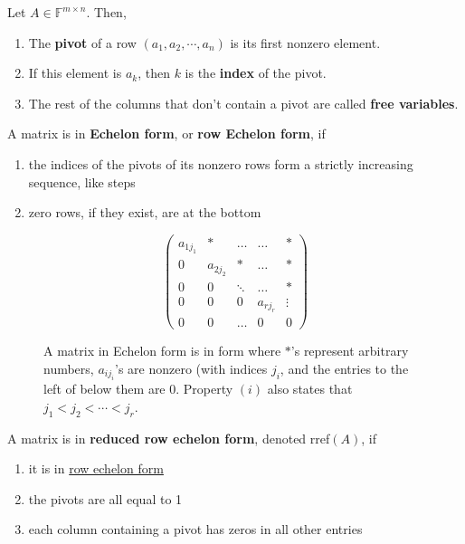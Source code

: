  \begin{definition}[Pivot]
    \label{def:pivot}
		Let $A \in \mathbb{F}^{m \times n}$. Then, 
		\begin{enumerate}
		  \item The \textbf{pivot} of a row $(a_1, a_2, \cdots, a_n)$ is its first nonzero element. 
			\item If this element is $a_k$, then $k$ is the \textbf{index} of the pivot. 
			\item The rest of the columns that don't contain a pivot are called \textbf{free variables}. 
		\end{enumerate}
  \end{definition}

  \begin{definition}
    \label{def:row-echelon-form}
    A matrix is in \textbf{Echelon form}, or \textbf{row Echelon form}, if 
    \begin{enumerate}
      \item the indices of the pivots of its nonzero rows form a strictly increasing sequence, like steps
      \item zero rows, if they exist, are at the bottom
    \end{enumerate}

		\begin{figure}[H]
			\centering 
			\begin{equation}
				\begin{pmatrix}
					a_{1 j_1} & * & \ldots & \ldots & * \\
					0 & a_{2 j_2} & * & \ldots & * \\
					0& 0& \ddots & \ldots & * \\
					0& 0& 0& a_{r j_r} & \vdots \\
					0 & 0 & \ldots & 0 & 0
				\end{pmatrix}
			\end{equation}
			\caption{A matrix in Echelon form is in form where $*$'s represent arbitrary numbers, $a_{i j_i}$'s are nonzero (with indices $j_i$, and the entries to the left of below them are $0$. Property $(i)$ also states that $j_1 < j_2 < \cdots < j_r$. } 
			\label{fig:echelon}
		\end{figure}
  \end{definition}

	\begin{definition}
	  \label{def:reduced-row-echelon-form}
    A matrix is in \textbf{reduced row echelon form}, denoted rref$(A)$, if
    \begin{enumerate}
      \item it is in \hyperref[def:row-echelon-form]{row echelon form}
      \item the pivots are all equal to 1
      \item each column containing a pivot has zeros in all other entries
    \end{enumerate}
  \end{definition}

